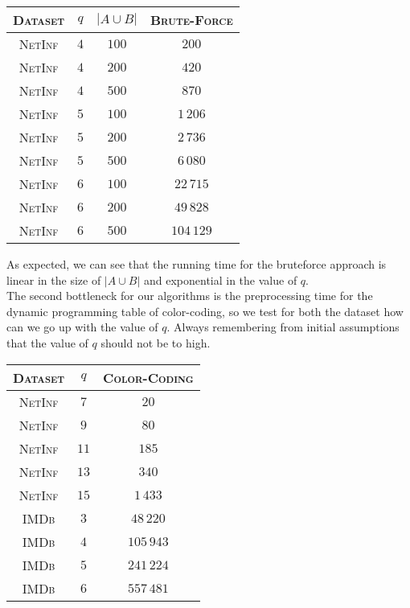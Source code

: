 	\begin{table}[h]
		\centering
		\label{my-label}
		\begin{tabular}{|c|c|c|c|}
			\hline
			\textsc{Dataset} & $q$ & $|A \cup B|$ & \textsc{Brute-Force} \\ \hline \hline
			\textsc{NetInf}  & $4$ & $100$        & $200$ \\ \hline
			\textsc{NetInf}  & $4$ & $200$        & $420$ \\ \hline
			\textsc{NetInf}  & $4$ & $500$        & $870$ \\ \hline \hline
			\textsc{NetInf}  & $5$ & $100$        & $1\,206$ \\ \hline
			\textsc{NetInf}  & $5$ & $200$        & $2\,736$ \\ \hline
			\textsc{NetInf}  & $5$ & $500$        & $6\,080$ \\ \hline \hline
			\textsc{NetInf}  & $6$ & $100$        & $22\,715$ \\ \hline
			\textsc{NetInf}  & $6$ & $200$        & $49\,828$ \\ \hline
			\textsc{NetInf}  & $6$ & $500$        & $104\,129$ \\ \hline
		\end{tabular}
	\end{table}

	As expected, we can see that the running time for the bruteforce approach is linear in the size of $|A \cup B|$ and exponential in the value of $q$.\\
	
	The second bottleneck for our algorithms is the preprocessing time for the dynamic programming table of color-coding, so we test for both the dataset how can we go up with the value of $q$. Always remembering from initial assumptions that the value of $q$ should not be to high. 

	\begin{table}[h]
		\centering
		\label{my-label}
		\begin{tabular}{|c|c|c|}
			\hline
			\textsc{Dataset} & $q$  & \textsc{Color-Coding} \\ \hline \hline
			\textsc{NetInf} & $7$  & $20$ \\ \hline
			\textsc{NetInf} & $9$  & $80$ \\ \hline
			\textsc{NetInf} & $11$ & $185$ \\ \hline
			\textsc{NetInf} & $13$ & $340$ \\ \hline
			\textsc{NetInf} & $15$ & $1\,433$ \\ \hline \hline
			\textsc{IMDb}   & $3$  & $48\,220$ \\ \hline
			\textsc{IMDb}   & $4$  & $105\,943$ \\ \hline
			\textsc{IMDb}   & $5$  & $241\,224$ \\ \hline
			\textsc{IMDb}   & $6$  & $557\,481$ \\ \hline
		\end{tabular}
	\end{table}

